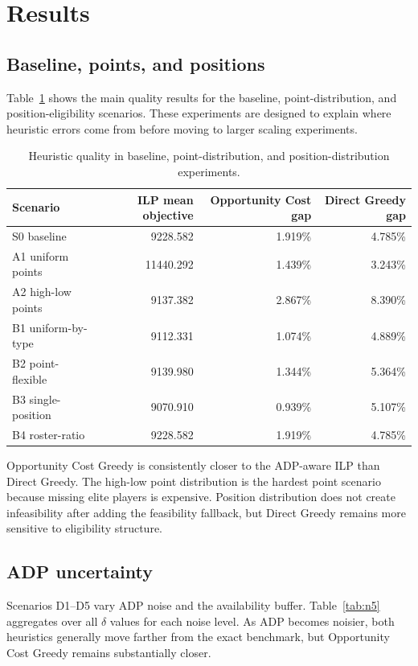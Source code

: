 \documentclass[12pt]{article}
\begin{document}
\section{Results}
\subsection{Baseline, points, and positions}
Table~\ref{tab:n1n3} shows the main quality results for the baseline, point-distribution, and position-eligibility scenarios. These experiments are designed to explain where heuristic errors come from before moving to larger scaling experiments.

\begin{table}[H]
\centering
\small
\caption{Heuristic quality in baseline, point-distribution, and position-distribution experiments.}
\label{tab:n1n3}
\begin{tabular}{lrrr}
\toprule
Scenario & ILP mean objective & Opportunity Cost gap & Direct Greedy gap\\
\midrule
S0 baseline & 9228.582 & 1.919\% & 4.785\%\\
A1 uniform points & 11440.292 & 1.439\% & 3.243\%\\
A2 high-low points & 9137.382 & 2.867\% & 8.390\%\\
B1 uniform-by-type & 9112.331 & 1.074\% & 4.889\%\\
B2 point-flexible & 9139.980 & 1.344\% & 5.364\%\\
B3 single-position & 9070.910 & 0.939\% & 5.107\%\\
B4 roster-ratio & 9228.582 & 1.919\% & 4.785\%\\
\bottomrule
\end{tabular}
\end{table}

Opportunity Cost Greedy is consistently closer to the ADP-aware ILP than Direct Greedy. The high-low point distribution is the hardest point scenario because missing elite players is expensive. Position distribution does not create infeasibility after adding the feasibility fallback, but Direct Greedy remains more sensitive to eligibility structure.

\subsection{ADP uncertainty}
Scenarios D1--D5 vary ADP noise and the availability buffer. Table~\ref{tab:n5} aggregates over all \(\delta\) values for each noise level. As ADP becomes noisier, both heuristics generally move farther from the exact benchmark, but Opportunity Cost Greedy remains substantially closer.
\end{document}
